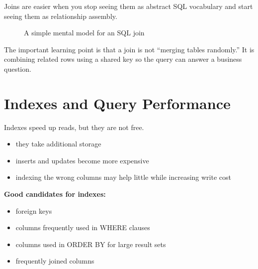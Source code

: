 \documentclass[12pt, a4paper, oneside]{book}
\begin{document}
Joins are easier when you stop seeing them as abstract SQL vocabulary and start seeing them as relationship assembly.

\begin{figure}[H]
\centering
{}
\caption{A simple mental model for an SQL join}
\label{fig:sql-join-intuition}
\end{figure}

The important learning point is that a join is not ``merging tables randomly.'' It is combining related rows using a shared key so the query can answer a business question.

\section{Indexes and Query Performance}

Indexes speed up reads, but they are not free.
\begin{itemize}[leftmargin=2em]
    \item they take additional storage
    \item inserts and updates become more expensive
    \item indexing the wrong columns may help little while increasing write cost
\end{itemize}

\textbf{Good candidates for indexes:}
\begin{itemize}[leftmargin=2em]
    \item foreign keys
    \item columns frequently used in WHERE clauses
    \item columns used in ORDER BY for large result sets
    \item frequently joined columns
\end{itemize}
\end{document}
